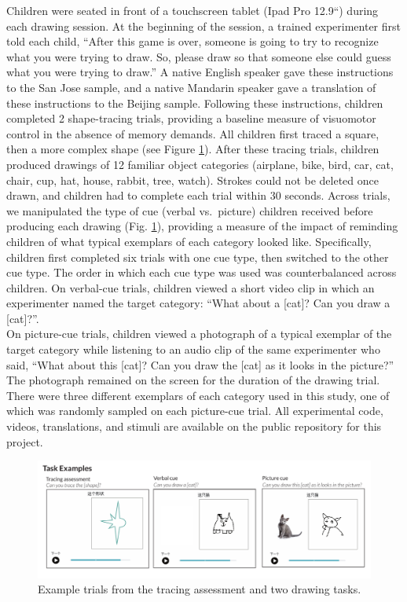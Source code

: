 \documentclass[
  english,
  man]{apa6}
\begin{document}
Children were seated in front of a touchscreen tablet (Ipad Pro 12.9\enquote{) during each drawing session.
At the beginning of the session, a trained experimenter first told each child, ``After this game is over, someone is going to try to recognize what you were trying to draw. So, please draw so that someone else could guess what you were trying to draw.}
A native English speaker gave these instructions to the San Jose sample, and a native Mandarin speaker gave a translation of these instructions to the Beijing sample.
Following these instructions, children completed 2 shape-tracing trials, providing a baseline measure of visuomotor control in the absence of memory demands.
All children first traced a square, then a more complex shape (see Figure \ref{fig:example-tasks}).
After these tracing trials, children produced drawings of 12 familiar object categories (airplane, bike, bird, car, cat, chair, cup, hat, house, rabbit, tree, watch).
Strokes could not be deleted once drawn, and children had to complete each trial within 30 seconds.
Across trials, we manipulated the type of cue (verbal vs.~picture) children received before producing each drawing (Fig. \ref{fig:example-tasks}), providing a measure of the impact of reminding children of what typical exemplars of each category looked like.
Specifically, children first completed six trials with one cue type, then switched to the other cue type.
The order in which each cue type was used was counterbalanced across children.
On verbal-cue trials, children viewed a short video clip in which an experimenter named the target category: \enquote{What about a {[}cat{]}? Can you draw a {[}cat{]}?}.\\
On picture-cue trials, children viewed a photograph of a typical exemplar of the target category while listening to an audio clip of the same experimenter who said, \enquote{What about this {[}cat{]}? Can you draw the {[}cat{]} as it looks in the picture?}
The photograph remained on the screen for the duration of the drawing trial.
There were three different exemplars of each category used in this study, one of which was randomly sampled on each picture-cue trial.
All experimental code, videos, translations, and stimuli are available on the public repository for this project.

\begin{figure}[H]
\includegraphics[width=1\linewidth]{figs/task_examples} \caption{Example trials from the tracing assessment and two drawing tasks.}\label{fig:example-tasks}
\end{figure}
\end{document}
